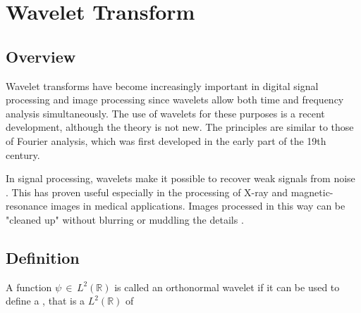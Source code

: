 \section{Wavelet Transform}

\subsection{Overview}
Wavelet transforms have become increasingly important in digital signal processing and image processing since wavelets allow both time and frequency analysis simultaneously. The use of wavelets for these purposes is a recent development, although the theory is not new. The principles are similar to those of Fourier analysis, which was first developed in the early part of the 19th century.

In signal processing, wavelets make it possible to recover weak signals from noise . This has proven useful especially in the processing of X-ray and magnetic-resonance images in medical applications. Images processed in this way can be "cleaned up" without blurring or muddling the details \cite{leewavelet}.

\subsection{Definition}
A function $\psi \,\in\, L^2(\mathbb{R})$  is called an
orthonormal wavelet if it can be used to define a
, that is a
$L^2\left(\mathbb{R}\right)$ of

